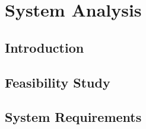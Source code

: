\chapter{System Analysis}
\section{Introduction}

\section{Feasibility Study}

\section{System Requirements}